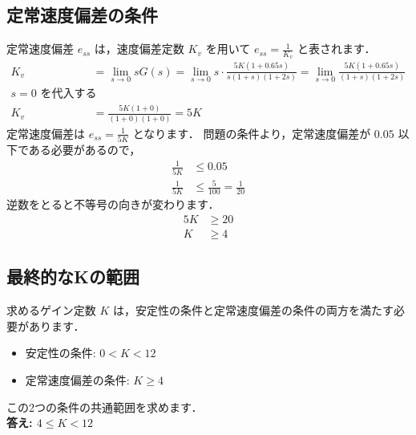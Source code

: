 \documentclass[11pt,a4paper]{ltjsarticle}
\begin{document}
\subsection{定常速度偏差の条件}
定常速度偏差 $e_{ss}$ は，速度偏差定数 $K_v$ を用いて $e_{ss} = \frac{1}{K_v}$ と表されます．
\begin{align*}
    K_v &= \lim_{s \to 0} sG(s) = \lim_{s \to 0} s \cdot \frac{5K(1+0.65s)}{s(1+s)(1+2s)} = \lim_{s \to 0} \frac{5K(1+0.65s)}{(1+s)(1+2s)} \\
    s=0 \text{ を代入すると，} \\
    K_v &= \frac{5K(1+0)}{(1+0)(1+0)} = 5K
\end{align*}
定常速度偏差は $e_{ss} = \frac{1}{5K}$ となります．
問題の条件より，定常速度偏差が $0.05$ 以下である必要があるので，
\begin{align*}
    \frac{1}{5K} &\le 0.05 \\
    \frac{1}{5K} &\le \frac{5}{100} = \frac{1}{20}
\end{align*}
逆数をとると不等号の向きが変わります．
\begin{align*}
    5K &\ge 20 \\
    K &\ge 4
\end{align*}

\subsection{最終的なKの範囲}
求めるゲイン定数 $K$ は，安定性の条件と定常速度偏差の条件の両方を満たす必要があります．
\begin{itemize}
    \item 安定性の条件: $0 < K < 12$
    \item 定常速度偏差の条件: $K \ge 4$
\end{itemize}
この2つの条件の共通範囲を求めます．\\
\textbf{答え: $4 \le K < 12$}
\end{document}
